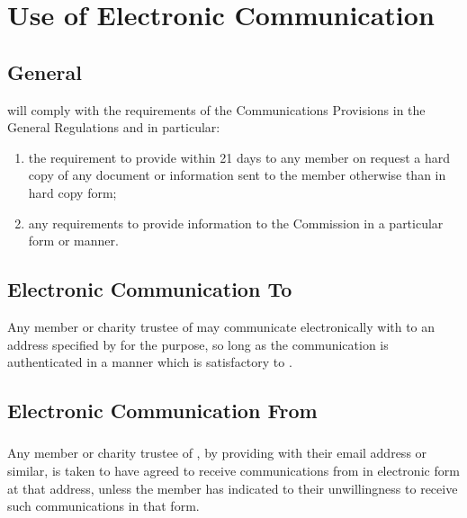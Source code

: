 \section{Use of Electronic Communication}\label{sec:comms}

    \subsection{General}
    \shortname{} will comply with the requirements of the Communications Provisions in the General Regulations and in particular:
    \begin{enumerate}
        \item the requirement to provide within 21 days to any member on request a hard copy of any document or information sent to the member otherwise than in hard copy form;
        \item any requirements to provide information to the Commission in a particular form or manner.
    \end{enumerate}

    \subsection{Electronic Communication To \shortname{}}
    Any member or charity trustee of \shortname{} may communicate electronically with \shortname{} to an address specified by \shortname{} for the purpose, so long as the communication is authenticated in a manner which is satisfactory to \shortname{}.

    \subsection{Electronic Communication From \shortname{}}

        \subsubsection{}
        Any member or charity trustee of \shortname{}, by providing \shortname{} with their email address or similar, is taken to have agreed to receive communications from \shortname{} in electronic form at that address, unless the member has indicated to \shortname{} their unwillingness to receive such communications in that form.

